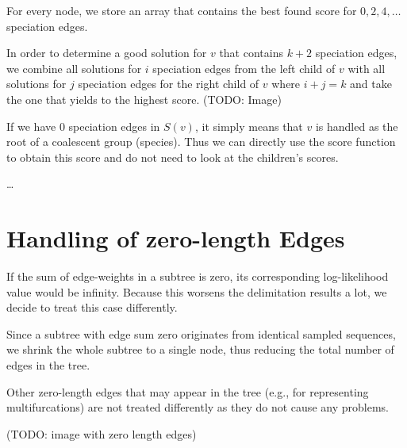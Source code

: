 \documentclass{llncs}
\begin{document}
For every node, we store an array that contains the best found score for $0, 2, 4, \ldots$ speciation edges.

In order to determine a good solution for $v$ that contains $k+2$ speciation edges, we combine all solutions for $i$ speciation edges from the left child of $v$ with all solutions for $j$ speciation edges for the right child of $v$ where $i+j=k$ and take the one that yields to the highest score. (TODO: Image)

If we have $0$ speciation edges in $S(v)$, it simply means that $v$ is handled as the root of a coalescent group (species). Thus we can directly use the score function to obtain this score and do not need to look at the children's scores.

\ldots

\section{Handling of zero-length Edges}

If the sum of edge-weights in a subtree is zero, its corresponding log-likelihood value would be infinity. Because this worsens the delimitation results a lot, we decide to treat this case differently.

Since a subtree with edge sum zero originates from identical sampled sequences, we shrink the whole subtree to a single node, thus reducing the total number of edges in the tree.

Other zero-length edges that may appear in the tree (e.g., for representing multifurcations) are not treated differently as they do not cause any problems.

(TODO: image with zero length edges)



\end{document}
